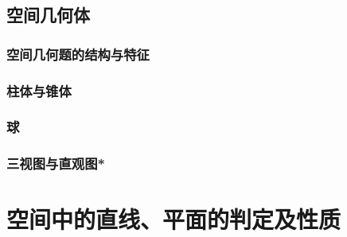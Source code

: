 \section{空间几何体}
\subsection{空间几何题的结构与特征}
\clearpage
\subsection{柱体与锥体}
\clearpage
\subsection{球}
\clearpage
\subsection{三视图与直观图*}
\clearpage
\chapter{空间中的直线、平面的判定及性质}
\clearpage
